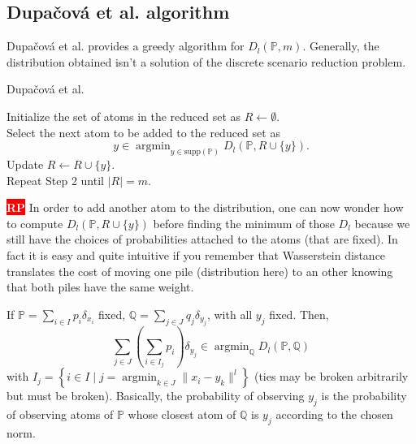 \documentclass{amsart}
\newcommand{\argmin}{\mathop{\arg\min}}
\newcommand{\nb}[3]{
		{\colorbox{#2}{\bfseries\sffamily\tiny\textcolor{white}{#1}}}
		{\textcolor{#2}{\text{$\blacktriangleright$}{\textcolor{#2}{#3}}\text{$\blacktriangleleft$}}}}
\newcommand{\rp}[1]{\nb{RP}{red}{#1}}
\begin{document}
\subsection{Dupačová et al. algorithm}
Dupačová et al. \cite{dupacova_scenario_2003} provides a greedy algorithm for $D_l\left(\mathbb{P},m\right)$. Generally, the distribution obtained isn't a solution of the discrete scenario reduction problem.
\begin{algorithm}
  \caption{Dupačová et al.}\label{dupacova}
  Initialize the set of atoms in the reduced set as $R\gets \emptyset.$ \\ Select the next atom to be added to the reduced set as $$ y\in\argmin_{y\in \text{supp}\left(\mathbb{P}\right)}D_l\left(\mathbb{P},R\cup\{y\}\right).
  $$
  Update $R\gets R\cup \{y\}$.\\ Repeat Step 2 until $\lvert R\rvert=m$.
\end{algorithm}
\rp{box is too large, don't know how to deal with that}
In order to add another atom to the distribution, one can now wonder how to compute $D_l\left(\mathbb{P},R\cup\{y\}\right)$ before finding the minimum of those $D_l$ because we still have the choices of probabilities attached to the atoms (that are fixed). In fact it is easy and quite intuitive if you remember that Wasserstein distance translates the cost of moving one pile (distribution here) to an other knowing that both piles have the same weight.
\begin{theorem}
    If $\mathbb{P}=\sum_{i\in I}p_i\delta_{x_i}$ fixed, $\mathbb{Q}=\sum_{j\in J}q_j\delta_{y_j}$, with all $y_j$ fixed. Then, 
    $$\sum_{j\in J}\left(\sum_{i\in I_j}p_i\right)\delta_{y_j}\in \argmin_\mathbb{Q} D_l\left(\mathbb{P},\mathbb{Q}\right)$$
    with $I_j=\left\{i\in I \mid j=\argmin_{k\in J} \lVert x_i-y_k\rVert^l\right\}$ (ties may be broken arbitrarily but must be broken). Basically, the probability of observing $y_j$ is the probability of observing atoms of $\mathbb{P}$ whose closest atom of $\mathbb{Q}$ is $y_j$ according to the chosen norm.
\end{theorem}
\end{document}
